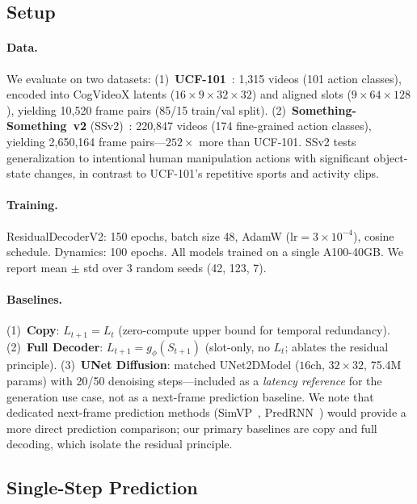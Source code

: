 \documentclass{article}
\begin{document}
\subsection{Setup}
\label{sec:setup}

\paragraph{Data.}
We evaluate on two datasets:
(1)~\textbf{UCF-101}~\cite{soomro2012ucf101}: 1{,}315 videos (101
action classes), encoded into CogVideoX latents
($16 \times 9 \times 32 \times 32$) and aligned slots
($9 \times 64 \times 128$), yielding 10{,}520 frame pairs
(85/15 train/val split).
(2)~\textbf{Something-Something~v2} (SSv2)~\cite{goyal2017something}:
220{,}847 videos (174 fine-grained action classes), yielding 2{,}650{,}164
frame pairs---$252\times$ more than UCF-101.
SSv2 tests generalization to intentional human manipulation actions
with significant object-state changes, in contrast to UCF-101's
repetitive sports and activity clips.

\paragraph{Training.}
ResidualDecoderV2: 150 epochs, batch size 48, AdamW ($\text{lr}{=}3{\times}10^{-4}$),
cosine schedule.
Dynamics: 100 epochs.
All models trained on a single A100-40GB.
We report mean $\pm$ std over 3 random seeds (42, 123, 7).

\paragraph{Baselines.}
(1)~\textbf{Copy}: $L_{t+1} = L_t$ (zero-compute upper bound for
temporal redundancy).
(2)~\textbf{Full Decoder}: $L_{t+1} = g_\phi(S_{t+1})$ (slot-only,
no $L_t$; ablates the residual principle).
(3)~\textbf{UNet Diffusion}: matched UNet2DModel
($16$ch, $32{\times}32$, 75.4M params) with 20/50 denoising
steps---included as a \emph{latency reference} for the generation
use case, not as a next-frame prediction baseline.
We note that dedicated next-frame prediction methods
(SimVP~\cite{gao2022simvp}, PredRNN~\cite{wang2022predrnn}) would
provide a more direct prediction comparison; our primary baselines
are copy and full decoding, which isolate the residual principle.

\subsection{Single-Step Prediction}
\label{sec:single_step}
\end{document}
